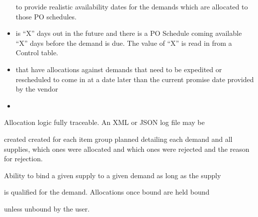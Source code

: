 \documentclass[letterpaper,10pt,english]{sphinxmanual}
\begin{document}
\begin{itemize}
to
\textbar{} provide realistic availability dates for the demands which are
\textbar{} allocated to those PO schedules.

\item {} 

is
\textbar{} “X” days out in the future and there is a PO Schedule coming
\textbar{} available “X” days before the demand is due. The value of “X” is
\textbar{} read in from a Control table.

\item {} 

that
\textbar{} have allocations against demands that need to be expedited or
\textbar{} rescheduled to come in at a date later than the current promise
date
\textbar{} provided by the vendor

\item {} 

\end{itemize}

\begin{DUlineblock}{0em}
\item[] Allocation logic fully traceable. An XML or JSON log file may be
\end{DUlineblock}

created created
\textbar{} for each item group planned detailing each demand and all supplies,
\textbar{} which ones were allocated and which ones were rejected and the reason
\textbar{} for rejection.

\begin{DUlineblock}{0em}
\item[] Ability to bind a given supply to a given demand as long as the supply
\item[] is qualified for the demand. Allocations once bound are held bound
\item[] unless unbound by the user.
\end{DUlineblock}
\end{document}
